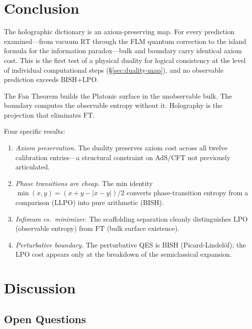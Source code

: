 \documentclass[11pt,a4paper]{article}
\theoremstyle{plain}
\theoremstyle{definition}
\newcommand{\LPO}{\ensuremath{\mathrm{LPO}}}
\newcommand{\LLPO}{\ensuremath{\mathrm{LLPO}}}
\newcommand{\BISH}{\ensuremath{\mathrm{BISH}}}
\newcommand{\FT}{\ensuremath{\mathrm{FT}}}
\newcommand{\RT}{\ensuremath{\mathrm{RT}}}
\begin{document}
\section{Conclusion}\label{sec:conclusion}

The holographic dictionary is an axiom-preserving map.
For every prediction examined---from vacuum $\RT$ through the FLM
quantum correction to the island formula for the information
paradox---bulk and boundary carry identical axiom cost.
This is the first test of a physical duality for logical consistency
at the level of individual computational steps
(\S\ref{sec:duality-map}), and no observable prediction exceeds
$\BISH$+$\LPO$.

The Fan Theorem builds the Platonic surface in the unobservable bulk.
The boundary computes the observable entropy without it.
Holography is the projection that eliminates $\FT$.

Four specific results:
\begin{enumerate}[nosep]
\item \emph{Axiom preservation.}
  The duality preserves axiom cost across all twelve calibration
  entries---a structural constraint on AdS/CFT not previously
  articulated.
\item \emph{Phase transitions are cheap.}
  The min identity $\min(x,y) = (x+y-|x-y|)/2$ converts
  phase-transition entropy from a comparison ($\LLPO$) into
  pure arithmetic ($\BISH$).
\item \emph{Infimum vs.\ minimizer.}
  The scaffolding separation cleanly distinguishes
  $\LPO$ (observable entropy) from $\FT$ (bulk surface existence).
\item \emph{Perturbative boundary.}
  The perturbative QES is $\BISH$ (Picard-Lindel\"of);
  the $\LPO$ cost appears only at the breakdown of the
  semiclassical expansion.
\end{enumerate}

\section{Discussion}\label{sec:discussion}

\subsection{Open Questions}
\end{document}
